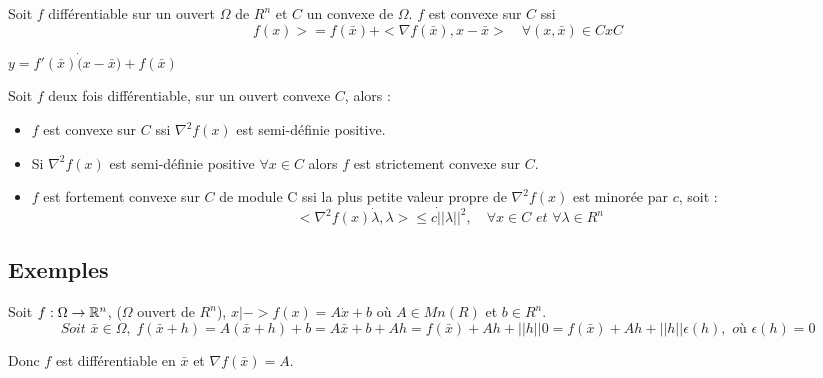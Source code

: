 		\begin{theoreme}
		Soit $f$ différentiable sur un ouvert $\Omega$ de $R^n$ et $C$ un convexe de $\Omega$.
		$f$ est convexe sur $C$ ssi \[f(x) >= f(\bar{x}) + <\nabla f(\bar{x}), x-\bar{x}> \quad\forall (x, \bar{x}) \in C x C\]
		\end{theoreme}
		
		$y=f'(\bar{x}) \dot (x-\bar{x}) +f(\bar{x})$
		
		\begin{theoreme}
		Soit $f$ deux fois différentiable, sur un ouvert convexe $C$, alors :
		\begin{itemize}
			\item $f$ est convexe sur $C$ ssi $\nabla^2 f(x)$ est semi-définie positive.
			\item Si $\nabla^2 f(x)$ est semi-définie positive $\forall x \in C$ alors $f$ est strictement convexe sur $C$.
			\item $f$ est fortement convexe sur $C$ de module C ssi la plus petite valeur propre de $\nabla^2 f(x)$ est minorée par $c$, soit : \[<\nabla^2 f(x) \dot \lambda, \lambda> \leq c \dot ||\lambda ||^2, \quad\forall x \in C \textit{ et } \forall \lambda \in R^n\]
		\end{itemize}
		\end{theoreme}
		
		
	\subsection{Exemples}
	
		\begin{exemple}
		
		Soit $f:\Omega \rightarrow \mathbb{R}^n$, ($\Omega$ ouvert de $R^n$), $x|-> f(x) = A \dot x +b$ où $A \in Mn(R)$ et $b \in R^n$.
		\[\textit{Soit }\bar{x} \in \Omega, \; f(\bar{x} +h) = A (\bar{x}+h) + b = A \bar{x} + b + Ah = f(\bar{x}) + Ah + ||h|| 0 = f(\bar{x}) + Ah + ||h|| \epsilon (h), \textit{ où } \epsilon (h) = 0\]
		
		Donc $f$ est différentiable en $\bar{x}$ et $\nabla f(\bar{x}) = A$.
		\end{exemple}
		
